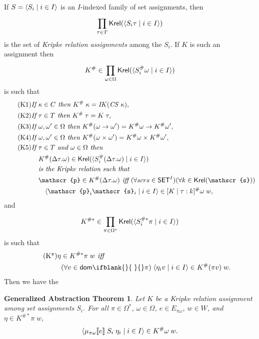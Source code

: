 \documentclass[sigplan,screen,nonacm,balance=false]{acmart}
\theoremstyle{plain}
\DeclarePairedDelimiter{\pair}{\langle}{\rangle}
\DeclarePairedDelimiter{\interp}{\llbracket}{\rrbracket}
\newcommand{\dom}[1]{\mathsf{dom}\ifblank{#1}{\;}{#1}}
\newcommand{\CS}{\mathit{CS}}
\newcommand{\IK}{\mathit{IK}}
\newcommand{\SET}{\mathsf{SET}}
\newcommand{\Krel}{\mathsf{Krel}}
\newcommand{\scrs}{\mathscr{s}}
\newcommand{\scrp}{\mathscr{p}}
\begin{document}
If $S = \pair{S_i \mid i \in I}$ is an $I$-indexed family of set assignments, then
%
\begin{equation*}
  \prod_{\tau \in T}^{} \Krel(\pair{S_i \tau \mid i \in I})
\end{equation*}
%
is the set of \emph{Kripke relation assignments} among the $S_i$.
If $K$ is such an assignment then
%
\begin{equation*}
  K^\# \in \prod_{\omega \in \Omega}^{} \Krel(\pair{S_i^\# \omega \mid i \in I})
\end{equation*}
%
is such that
%
\begin{align*}
  \tag{K1}
  \textit{If } & \kappa \in C \textit{ then } K^\# \; \kappa = \IK(\CS \; \kappa), \\
  \tag{K2}
  \textit{If } & \tau \in T \textit{ then } K^\# \; \tau = K \; \tau, \\
  \tag{K3}
  \textit{If } & \omega, \omega' \in \Omega \textit{ then } K^\#(\omega \to \omega') = K^\# \omega \to K^\# \omega', \\
  \tag{K4}
  \textit{If } & \omega, \omega' \in \Omega \textit{ then } K^\#(\omega \times \omega') = K^\# \omega \times K^\# \omega', \\
  \tag{K5}
  \textit{If } & \tau \in T \textit{ and } \omega \in \Omega \textit{ then } \\
  & K^\#(\Delta \tau. \omega) \in \Krel(\pair{S_i^\#(\Delta \tau. \omega) \mid i \in I}) \\
  & \textit{is the Kripke relation such that} \\
  & \scrp \in K^\#(\Delta \tau. \omega) \textit{ iff } (\forall scrs \in \SET^I) (\forall k \in \Krel(\scrs)) \\
  & \quad \pair{\scrp_i \scrs_i \mid i \in I} \in [K \mid \tau: k]^\# \omega \; w,
\end{align*}
%
and
%
\begin{equation*}
  K^{\#*} \in \prod_{\pi \in \Omega^*}^{} \Krel(\pair{S_i^{\#*} \pi \mid i \in I})
\end{equation*}
is such that
%
\begin{align*}\tag{K*}
  \eta & \in K^{\#*} \pi \; w \textit{ iff } \\
  & (\forall v \in \dom{} \pi) \; \pair{\eta_i v \mid i \in I} \in K^\#(\pi v) \; w.
\end{align*}
%
Then we have the

\newtheorem*{genabs}{Generalized Abstraction Theorem}
\begin{genabs}
  Let $K$ be a Kripke relation assignment among set assignments $S_i$.
  For all $\pi \in \Omega^*$, $\omega \in \Omega$, $e \in E_{\pi \omega}$, $w \in W$, and $\eta \in K^{\#*} \pi \; w$,
  \begin{equation*}
    \pair{\mu_{\pi \omega} \interp{e} \; S_i \; \eta_i \mid i \in I} \in K^\# \omega \; w.
  \end{equation*}
\end{genabs}
\end{document}
